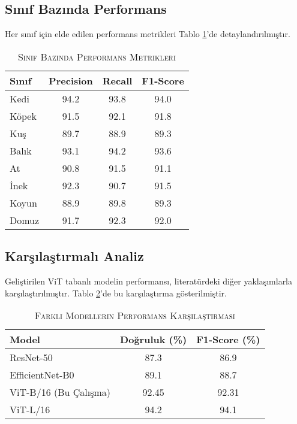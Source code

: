 \documentclass[conference, a4paper]{IEEEtran}
\begin{document}
	\subsection{Sınıf Bazında Performans}
	
	Her sınıf için elde edilen performans metrikleri Tablo \ref{tablo_class_results}'de detaylandırılmıştır.
	
	\begin{table}[h]
		\centering
		\caption{\textsc{Sınıf Bazında Performans Metrikleri}}
		\label{tablo_class_results}
		\begin{tabular}{|l|c|c|c|}
			\hline
			\textbf{Sınıf} & \textbf{Precision} & \textbf{Recall} & \textbf{F1-Score} \\
			\hline
			Kedi & 94.2 & 93.8 & 94.0 \\
			\hline
			Köpek & 91.5 & 92.1 & 91.8 \\
			\hline
			Kuş & 89.7 & 88.9 & 89.3 \\
			\hline
			Balık & 93.1 & 94.2 & 93.6 \\
			\hline
			At & 90.8 & 91.5 & 91.1 \\
			\hline
			İnek & 92.3 & 90.7 & 91.5 \\
			\hline
			Koyun & 88.9 & 89.8 & 89.3 \\
			\hline
			Domuz & 91.7 & 92.3 & 92.0 \\
			\hline
		\end{tabular}
	\end{table}
	
	\subsection{Karşılaştırmalı Analiz}
	
	Geliştirilen ViT tabanlı modelin performansı, literatürdeki diğer yaklaşımlarla karşılaştırılmıştır. Tablo \ref{tablo_comparison}'de bu karşılaştırma gösterilmiştir.
	
	\begin{table}[h]
		\centering
		\caption{\textsc{Farklı Modellerin Performans Karşılaştırması}}
		\label{tablo_comparison}
		\begin{tabular}{|l|c|c|}
			\hline
			\textbf{Model} & \textbf{Doğruluk (\%)} & \textbf{F1-Score (\%)} \\
			\hline
			ResNet-50 & 87.3 & 86.9 \\
			\hline
			EfficientNet-B0 & 89.1 & 88.7 \\
			\hline
			ViT-B/16 (Bu Çalışma) & 92.45 & 92.31 \\
			\hline
			ViT-L/16 & 94.2 & 94.1 \\
			\hline
		\end{tabular}
	\end{table}
	
\end{document}
